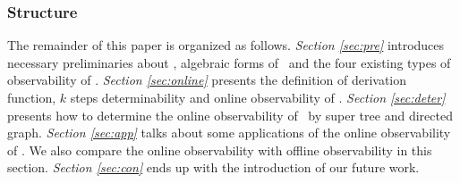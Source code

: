 \subsubsection*{Structure}
The remainder of this paper is organized as follows. {\em Section \ref{sec:pre}} introduces necessary preliminaries about \BCNs, algebraic forms of \BCNs\ and the four existing types of observability of  \BCNs. {\em Section \ref{sec:online}} presents the definition of derivation function, $k$ steps determinability and online observability of \BCNs. {\em Section \ref{sec:deter}} presents how to determine the online observability of \BCNs\ by super tree and directed graph. {\em Section \ref{sec:app}} talks about some applications of the online observability of \BCNs. We also compare the online observability with offline observability in this section. {\em Section \ref{sec:con}} ends up  with the introduction of our future work.


